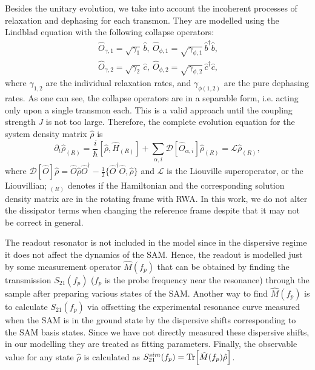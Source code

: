 \documentclass[%
 pra,
 amsmath,amssymb,
 reprint,%
]{revtex4-1}
\begin{document}
Besides the unitary evolution, we take into 
account the incoherent processes of relaxation 
and dephasing for each transmon. They are 
modelled using the Lindblad equation with the 
following collapse 
operators\cite{bishop2010circuit}:
\begin{equation}\
\begin{split}
\hat{{O}}_{\gamma, 1} = \sqrt{\gamma_1}\, \hat b,\ 
\hat{{O}}_{\phi, 1} = \sqrt{\gamma_{\phi,1}}\, 
\hat b^\dag \hat b,\\
\hat{{O}}_{\gamma,2} = \sqrt{\gamma_2}\, \hat c,\ 
\hat{{O}}_{\phi,2} = \sqrt{\gamma_{ \phi,2}}\, 
\hat c^\dag \hat c,
\end{split}
\end{equation}
where $\gamma_{1,2}$ are the individual 
relaxation rates, and $\gamma_{\phi (1,2)}$ are 
the pure dephasing rates. As one can see, the 
collapse operators are in a separable form, i.e. 
acting only upon a single transmon each. This is 
a valid approach until the coupling strength $J$ 
is not too large\cite{beaudoin2011dissipation}. 
Therefore, the complete evolution equation for 
the system density matrix $\hat \rho$ is
\begin{equation}
\partial_t \hat \rho_{(R)} = \frac{i}{\hbar}[\hat 
\rho, \hat H_{(R)}] + \sum_{\alpha, i} 
\mathcal{D}[\hat{O}_{\alpha, i}] \hat \rho_{(R)} 
= \mathcal{L}\hat\rho_{(R)}, \label{eq:master}
\end{equation}
where $\mathcal{D}[\hat{{O}}]\hat \rho = 
\hat{{O}} \hat \rho \hat{{O}}^\dag - 
\frac{1}{2}\{ \hat{{O}}^\dag \hat{{O}}, \hat 
\rho\}$ and $\mathcal{L}$ is the Liouville 
superoperator, or the Liouvillian; $_{(R)}$ 
denotes if the Hamiltonian and the corresponding 
solution density matrix are in the rotating frame 
with RWA. In this work, we do not alter the 
dissipator terms when changing the reference 
frame despite that it may not be correct in 
general\cite{shavit2019bridging}.


The readout resonator is not included in the 
model since in the dispersive regime it does not 
affect the dynamics of the SAM. Hence, the 
readout is modelled just by some measurement 
operator $\hat M(f_p)$ that can be obtained by 
finding the transmission $S_{21}(f_p)$ ($f_p$ is 
the probe frequency near the resonance) through 
the sample after preparing various states of the 
SAM. Another way to find $\hat M(f_p)$ is to 
calculate $S_{21}(f_p)$ via offsetting the 
experimental resonance curve measured when the 
SAM is in the ground state by the dispersive 
shifts corresponding to the SAM basis 
states\cite{filipp2009two}. Since we have not 
directly measured these dispersive shifts, in our 
modelling they are treated as fitting parameters. 
Finally, the observable value for any state $\hat 
\rho$ is calculated as $S_{21}^{sim}(f_p) = 
\Tr[\hat M(f_p) \hat \rho]$.
\end{document}
